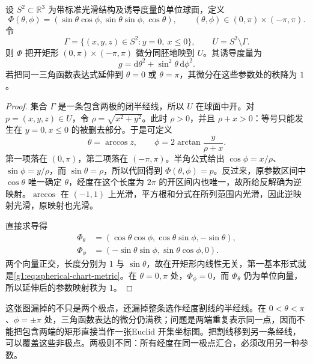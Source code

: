 \begin{proposition}
	\label{g1:prop:spherical-chart-domain}
	设 \(S^2\subset\mathbb R^3\) 为带标准光滑结构及诱导度量的单位球面，定义
	\[
		\Phi(\theta,\phi)=(\sin\theta\cos\phi,\sin\theta\sin\phi,\cos\theta),
		\qquad (\theta,\phi)\in(0,\pi)\times(-\pi,\pi).
	\]
	令
	\[
		\Gamma=\{(x,y,z)\in S^2:y=0,\ x\le0\},\qquad
		U=S^2\setminus\Gamma.
	\]
	则 \(\Phi\) 把开矩形 \((0,\pi)\times(-\pi,\pi)\) 微分同胚地映到 \(U\)。其诱导度量为
	\begin{equation}
		\label{g1:eq:spherical-chart-metric}
		g=\mathrm{d}\theta^2+\sin^2\theta\,\mathrm{d}\phi^2.
	\end{equation}
	若把同一三角函数表达式延伸到 \(\theta=0\) 或 \(\theta=\pi\)，其微分在这些参数处的秩降为 \(1\)。
\end{proposition}
\begin{proof}
	集合 \(\Gamma\) 是一条包含两极的闭半经线，所以 \(U\) 在球面中开。对 \(p=(x,y,z)\in U\)，令 \(\rho=\sqrt{x^2+y^2}\)。此时 \(\rho>0\)，并且 \(\rho+x>0\)：等号只能发生在 \(y=0,x\le0\) 的被删去部分。于是可定义
	\[
		\theta=\arccos z,\qquad
		\phi=2\arctan\frac{y}{\rho+x}.
	\]
	第一项落在 \((0,\pi)\)，第二项落在 \((-\pi,\pi)\)。半角公式给出 \(\cos\phi=x/\rho\)、\(\sin\phi=y/\rho\)，而 \(\sin\theta=\rho\)，所以代回得到 \(\Phi(\theta,\phi)=p\)。反过来，原参数区间中 \(\cos\theta\) 唯一确定 \(\theta\)，经度在这个长度为 \(2\pi\) 的开区间内也唯一，故所给反解确为逆映射。\(\arccos\) 在 \((-1,1)\) 上光滑，平方根和分式在所列范围内光滑，因此逆映射光滑，原映射也光滑。

	直接求导得
	\[
		\begin{aligned}
			\Phi_\theta&=(\cos\theta\cos\phi,\cos\theta\sin\phi,-\sin\theta),\\
			\Phi_\phi&=(-\sin\theta\sin\phi,\sin\theta\cos\phi,0).
		\end{aligned}
	\]
	两个向量正交，长度分别为 \(1\) 与 \(\sin\theta\)，故在开矩形内线性无关，第一基本形式就是\eqref{g1:eq:spherical-chart-metric}。在 \(\theta=0,\pi\) 处，\(\Phi_\phi=0\)，而 \(\Phi_\theta\) 仍为单位向量，所以延伸后的参数映射秩为 \(1\)。
\end{proof}

这张图漏掉的不只是两个极点，还漏掉整条选作经度割线的半经线。在 \(0<\theta<\pi\)、\(\phi=\pm\pi\) 处，三角函数表达的微分仍满秩；问题是两端重复表示同一点，因而不能把包含两端的矩形直接当作一张Euclid 开集坐标图。把割线移到另一条经线，可以覆盖这些非极点。两极则不同：所有经度在同一极点汇合，必须改用另一种参数。

\ProseParagraphBreak

